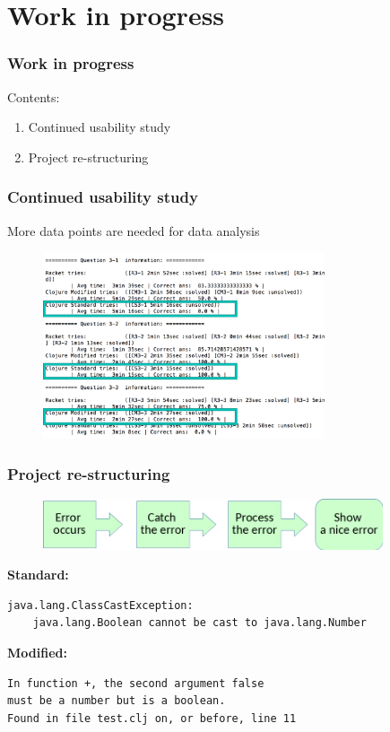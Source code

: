 \documentclass{beamer}
\begin{document}
\section{Work in progress}

\begin{frame}
  \frametitle{Work in progress}
Contents:
\begin{enumerate}
\item Continued usability study 
\item Project re-structuring
\end{enumerate}
\end{frame}

\begin{frame}
  \frametitle{Continued usability study }
More data points are needed for data analysis
\begin{figure}
\includegraphics[height=55mm]{one-data.png}
\end{figure}
\end{frame}


\begin{frame}[fragile]
  \frametitle{Project re-structuring}


\begin{figure}
\includegraphics[height=15mm]{Step.png}
\end{figure}
\textbf{Standard:} 
\begin{verbatim}
java.lang.ClassCastException: 
	java.lang.Boolean cannot be cast to java.lang.Number
\end{verbatim}
\textbf{Modified:}
\begin{verbatim}
In function +, the second argument false 
must be a number but is a boolean.
Found in file test.clj on, or before, line 11
\end{verbatim}
\end{frame}
\end{document}
